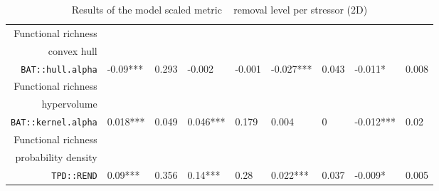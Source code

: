 \begin{table}[ht]
\begin{tabular}{rllllllll}
  Functional richness\\convex hull\\\texttt{BAT::hull.alpha} & -0.09*** & 0.293 & -0.002 & -0.001 & -0.027*** & 0.043 & -0.011* & 0.008 \\ 
  Functional richness\\hypervolume\\\texttt{BAT::kernel.alpha} & 0.018*** & 0.049 & 0.046*** & 0.179 & 0.004 & 0 & -0.012*** & 0.02 \\ 
  Functional richness\\probability density\\\texttt{TPD::REND} & 0.09*** & 0.356 & 0.14*** & 0.28 & 0.022*** & 0.037 & -0.009* & 0.005 \\ 
   \hline
\end{tabular}
\caption{Results of the model scaled metric ~ removal level per stressor (2D)} 
\end{table}
